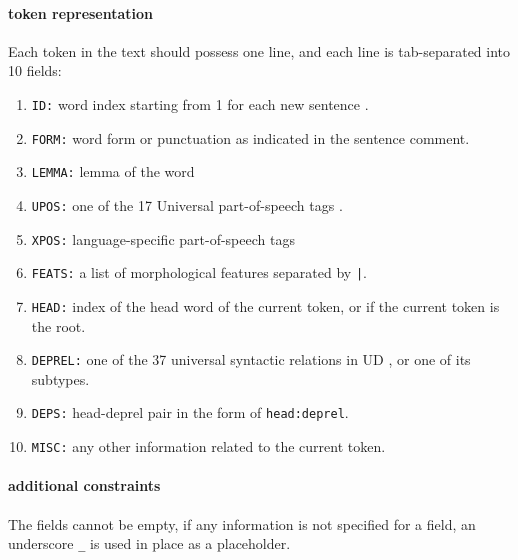 \paragraph{token representation} 
Each token  in the text should possess one line, and each line is tab-separated into 10 fields:
\begin{enumerate}
    \item \texttt{ID:} word index starting from 1 for each new sentence .
    \item \texttt{FORM:} word form or punctuation as indicated in the sentence comment.
    \item \texttt{LEMMA:} lemma of the word
    \item \texttt{UPOS:} one of the 17 Universal part-of-speech tags .
    \item \texttt{XPOS:} language-specific part-of-speech tags
    \item \texttt{FEATS:} a list of morphological features  separated by \texttt{|}.
    \item \texttt{HEAD:} index of the head word of the current token, or  if the current token is the root.
    \item \texttt{DEPREL:} one of the 37 universal syntactic relations in UD , or one of its subtypes.
    \item \texttt{DEPS:} head-deprel pair in the form of \texttt{head:deprel}.
    \item \texttt{MISC:} any other information related to the current token.
\end{enumerate}
\paragraph{additional constraints} The fields cannot be empty, if any information  is not specified for a field, an underscore \texttt{\_} is used in place as a placeholder.

